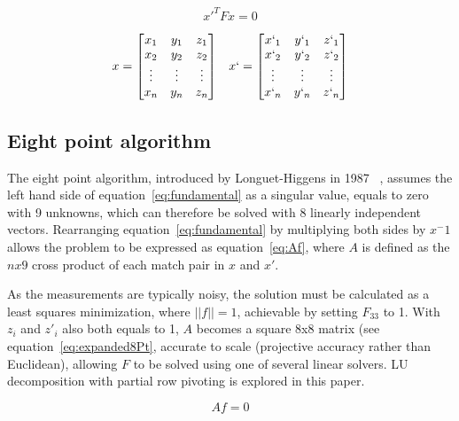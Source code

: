 \documentclass[Conference]{IEEEtran}
\begin{document}
\begin{center}
    \begin{equation}\label{eq:fundamental}
        {x}'^TFx = 0
    \end{equation}
\end{center}


\begin{align}\label{eq:points}
    x = 
    \begin{bmatrix}
        x_1 & y_1 & z_1\\ 
        x_2 & y_2 & z_2\\ 
        \vdots&\vdots&\vdots\\ 
        x_n&y_n&z_n\\
    \end{bmatrix}
    &&
    x` =
    \begin{bmatrix}
        x`_1 & y`_1 & z`_1\\ 
        x`_2 & y`_2 & z`_2\\ 
        \vdots & \vdots & \vdots\\ 
        x`_n&y`_n&z`_n\\
    \end{bmatrix}
\end{align}


\subsection{Eight point algorithm}
The eight point algorithm, introduced by Longuet-Higgens in 1987 ~\cite{Longuet-Higgins:1987:CAR:33517.33523}, assumes the left hand side of equation~\eqref{eq:fundamental} as a singular value, equals to zero with 9 unknowns, which can therefore be solved with 8 linearly independent vectors. Rearranging equation~\eqref{eq:fundamental} by multiplying both sides by ${x}^-1$ allows the problem to be expressed as equation~\eqref{eq:Af}, where $A$ is defined as the $n x 9$ cross product of each match pair in $x$ and $x'$.

As the measurements are typically noisy, the solution must be calculated as a least squares minimization, where $||f||=1$, achievable by setting $F_{33}$ to 1. With $z_i$  and $z'_i$ also both equals to 1, $A$ becomes a square 8x8 matrix (see equation~\eqref{eq:expanded8Pt}, accurate to scale (projective accuracy rather than Euclidean), allowing $F$ to be solved using one of several linear solvers. LU decomposition with partial row pivoting is explored in this paper.

\begin{equation}\label{eq:Af}Af=0\end{equation}
\end{document}
